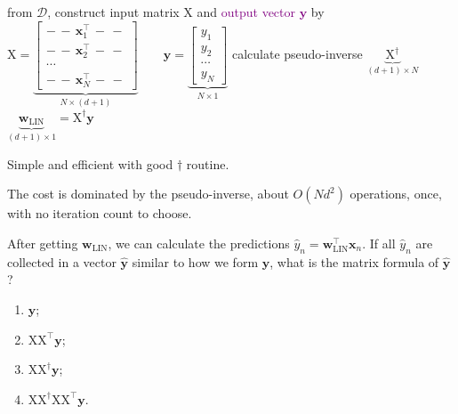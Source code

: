 \begin{algorithm}[H]
    \caption{Linear Regression}\label{alg:linreg}
    from \(\mathcal{D}\), construct \textcolor{red!80!black}{input matrix
    \(\mathrm{X}\)} and \textcolor{Purple}{output vector \(\bm{y}\)} by
    \(\displaystyle
        \mathrm{X} = \underbrace{\begin{bmatrix}
            - \,- \, \bm{x}_1^\top \, - \,-\\
            - \,- \, \bm{x}_2^\top \, - \,-\\
            \cdots\\
            - \,- \, \bm{x}_N^\top \, - \,-
        \end{bmatrix}}_{N \times (d+1)}
        \qquad
        \bm{y} = \underbrace{\begin{bmatrix}
            y_1\\ y_2\\ \cdots\\ y_N
        \end{bmatrix}}_{N \times 1}
    \)\;
    calculate pseudo-inverse \(\underbrace{\mathrm{X}^\dagger}_{(d+1) \times
    N}\)\;
    \Return \(\underbrace{\bm{w}_{\mathrm{LIN}}}_{(d+1) \times 1} =
    \mathrm{X}^\dagger \bm{y}\)\;
\end{algorithm}

\begin{moral}
    Simple and efficient with good \(\dagger\) routine.
\end{moral}

The cost is dominated by the pseudo-inverse, about \(O(N d^2)\) operations,
once, with no iteration count to choose.

\begin{exercise}
    After getting \(\bm{w}_{\mathrm{LIN}}\), we can calculate the predictions
    \(\hat{y}_n = \bm{w}_{\mathrm{LIN}}^\top \bm{x}_n\). If all \(\hat{y}_n\)
    are collected in a vector \(\hat{\bm{y}}\) similar to how we form
    \(\bm{y}\), what is the matrix formula of \(\hat{\bm{y}}\)?
    \begin{enumerate}[(1)]
        \item \(\bm{y}\);
        \item \(\mathrm{X} \mathrm{X}^\top \bm{y}\);
        \item \(\mathrm{X} \mathrm{X}^\dagger \bm{y}\);
        \item \(\mathrm{X} \mathrm{X}^\dagger \mathrm{X} \mathrm{X}^\top
            \bm{y}\).
    \end{enumerate}
\end{exercise}

